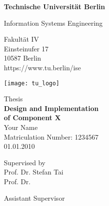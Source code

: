 \thispagestyle{empty}
\begin{center}

\vspace*{1.4cm}
{\LARGE \textbf{Technische Universität Berlin}}

\vspace{0.5cm}

{\large Information Systems Engineering\\[1mm]}

Fakultät IV\\
Einsteinufer 17\\
10587 Berlin\\
https://www.tu.berlin/ise\\

\vspace*{1cm}

\texttt{[image: tu\_logo]}

\vspace*{1.0cm}

{\LARGE Thesis}\\

\vspace{1.0cm}
{\LARGE \textbf{Design and Implementation}}\\
\vspace*{0.3cm}
{\LARGE \textbf{of Component X}}\\
\vspace*{1.0cm}
{\LARGE Your Name}
\\
\vspace*{0.5cm}
Matriculation Number: 1234567\\
01.01.2010\\ %
\vspace*{1.0cm}

Supervised by\\
Prof. Dr. Stefan Tai\\
Prof. Dr. 

\vspace*{0.5cm}
Assistant Supervisor\\
\vspace{3cm}


\end{center}

